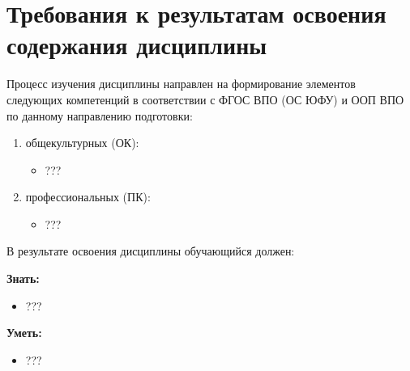 	\ssect %

	\ssect %

\section{Требования к результатам освоения содержания дисциплины}

	\ssect
Процесс изучения дисциплины направлен на формирование элементов следующих компетенций в соответствии с ФГОС ВПО (ОС ЮФУ) и ООП ВПО по данному направлению подготовки:
\begin{enumerate}
\rusitems %
	\item общекультурных (ОК):
	\begin{itemize}
		\item ???
	\end{itemize}

	\item профессиональных (ПК):
	\begin{itemize}
		\item ???
	\end{itemize}
\end{enumerate}

В результате освоения дисциплины обучающийся должен:

\textbf{Знать:}
	\begin{itemize}
		\item ???
	\end{itemize}

\textbf{Уметь:}
	\begin{itemize}
		\item ???
	\end{itemize}


